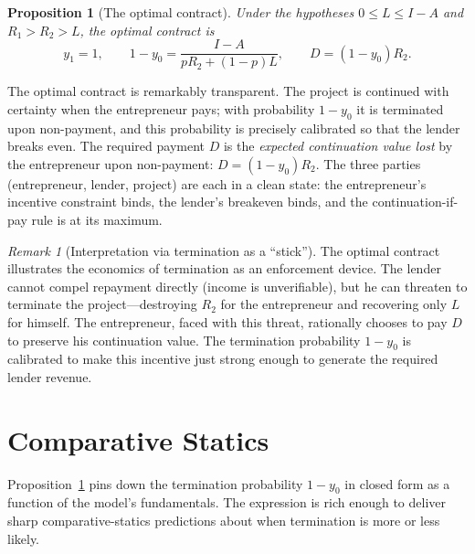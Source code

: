 \documentclass[11pt,a4paper,oneside]{book}
\def\leq{\leqslant}
\theoremstyle{plain}
\newtheorem{proposition}[theorem]{Proposition}
\theoremstyle{definition}
\theoremstyle{remark}
\newtheorem{remark}[theorem]{Remark}
\numberwithin{equation}{chapter}
\begin{document}
\begin{proposition}[The optimal contract]\label{prop:NV-optimal-form}
Under the hypotheses $0 \leq L \leq I - A$ and $R_1 > R_2 > L$, the optimal contract is
\begin{equation*}
  y_1 = 1,
  \qquad
  1 - y_0 = \frac{I - A}{p R_2 + (1 - p) L},
  \qquad
  D = (1 - y_0) R_2.
\end{equation*}
\end{proposition}

The optimal contract is remarkably transparent.
The project is continued with certainty when the entrepreneur pays; with probability $1 - y_0$ it is terminated upon non-payment, and this probability is precisely calibrated so that the lender breaks even.
The required payment $D$ is the \emph{expected continuation value lost} by the entrepreneur upon non-payment: $D = (1 - y_0) R_2$.
The three parties (entrepreneur, lender, project) are each in a clean state: the entrepreneur's incentive constraint binds, the lender's breakeven binds, and the continuation-if-pay rule is at its maximum.

\begin{remark}[Interpretation via termination as a ``stick'']\label{rem:termination-stick}
The optimal contract illustrates the economics of termination as an enforcement device.
The lender cannot compel repayment directly (income is unverifiable), but he can threaten to terminate the project---destroying $R_2$ for the entrepreneur and recovering only $L$ for himself.
The entrepreneur, faced with this threat, rationally chooses to pay $D$ to preserve his continuation value.
The termination probability $1 - y_0$ is calibrated to make this incentive just strong enough to generate the required lender revenue.
\end{remark}

\section{Comparative Statics}
\label{sec:NV-statics}

Proposition~\ref{prop:NV-optimal-form} pins down the termination probability $1 - y_0$ in closed form as a function of the model's fundamentals.
The expression is rich enough to deliver sharp comparative-statics predictions about when termination is more or less likely.
\end{document}
